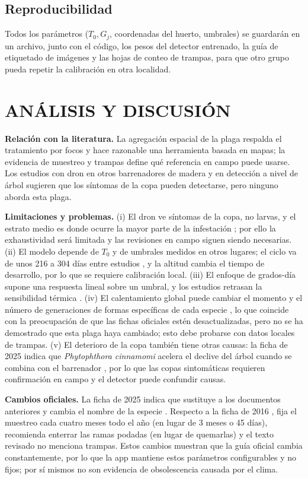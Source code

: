 \documentclass[conference]{IEEEtran}
\begin{document}
\subsection{Reproducibilidad}
Todos los parámetros ($T_{0}, G_{j}$, coordenadas del huerto, umbrales) se guardarán en un archivo, junto con el código, los pesos del detector entrenado, la guía de etiquetado de imágenes y las hojas de conteo de trampas, para que otro grupo pueda repetir la calibración en otra localidad.

\section{ANÁLISIS Y DISCUSIÓN}
\textbf{Relación con la literatura.} La agregación espacial de la plaga \cite{ref8} respalda el tratamiento por focos y hace razonable una herramienta basada en mapas; la evidencia de muestreo y trampas \cite{ref6, ref11} define qué referencia en campo puede usarse. Los estudios con dron en otros barrenadores de madera \cite{ref15} y en detección a nivel de árbol \cite{ref16, ref17} sugieren que los síntomas de la copa pueden detectarse, pero ninguno aborda esta plaga.

\textbf{Limitaciones y problemas.} (i) El dron ve síntomas de la copa, no larvas, y el estrato medio es donde ocurre la mayor parte de la infestación \cite{ref6}; por ello la exhaustividad será limitada y las revisiones en campo siguen siendo necesarias. (ii) El modelo depende de $T_{0}$ y de umbrales medidos en otros lugares; el ciclo va de unos 216 a 304 días entre estudios \cite{ref1}, y la altitud cambia el tiempo de desarrollo, por lo que se requiere calibración local. (iii) El enfoque de grados-día supone una respuesta lineal sobre un umbral, y los estudios retrasan la sensibilidad térmica \cite{ref20}. (iv) El calentamiento global puede cambiar el momento y el número de generaciones de formas específicas de cada especie \cite{ref18, ref19}, lo que coincide con la preocupación de que las fichas oficiales estén desactualizadas, pero no se ha demostrado que esta plaga haya cambiado; esto debe probarse con datos locales de trampas. (v) El deterioro de la copa también tiene otras causas: la ficha de 2025 indica que \textit{Phytophthora cinnamomi} acelera el declive del árbol cuando se combina con el barrenador \cite{ref6}, por lo que las copas sintomáticas requieren confirmación en campo y el detector puede confundir causas.

\textbf{Cambios oficiales.} La ficha de 2025 indica que sustituye a los documentos anteriores y cambia el nombre de la especie \cite{ref6}. Respecto a la ficha de 2016 \cite{ref1}, fija el muestreo cada cuatro meses todo el año (en lugar de 3 meses o 45 días), recomienda enterrar las ramas podadas (en lugar de quemarlas) y el texto revisado no menciona trampas. Estos cambios muestran que la guía oficial cambia constantemente, por lo que la app mantiene estos parámetros configurables y no fijos; por sí mismos no son evidencia de obsolescencia causada por el clima.
\end{document}

